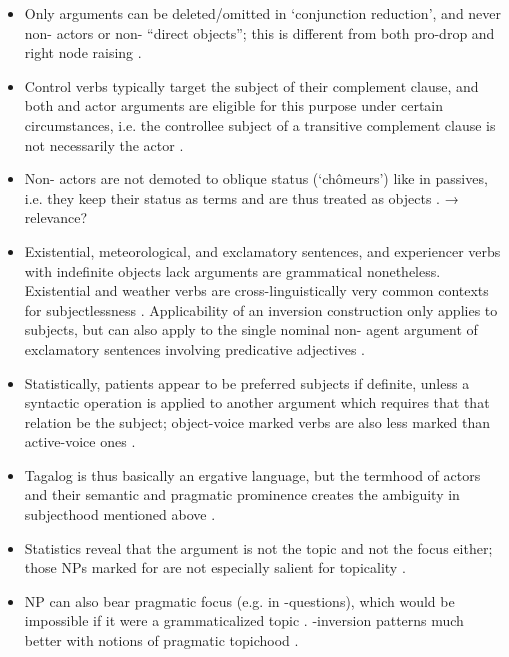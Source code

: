 \begin{itemize}
\begin{itemize}
		\item Only \Nom{} arguments can be deleted/omitted in `conjunction
		reduction', and never non-\Nom{} actors or non-\Nom{} ``direct
		objects''; this is different from both pro-drop and right node raising
		\citep[32-34]{kroeger1991}.
		\item Control verbs typically target the subject of their complement
		clause, and both \Nom{} and actor arguments are eligible for this
		purpose under certain circumstances, i.e. the controllee subject of a
		transitive complement clause is not necessarily the actor
		\citep[36--38]{kroeger1991}.
		\item Non-\Nom{} actors are not demoted to oblique status (`chômeurs')
		like in passives, i.e. they keep their status as terms and are thus
		treated as objects \citep[38\psqq]{kroeger1991}. → relevance?
		\item Existential, meteorological, and exclamatory sentences, and
		experiencer verbs with indefinite objects lack \Nom{} arguments are
		grammatical nonetheless. Existential and weather verbs are
		cross-linguistically very common contexts for subjectlessness
		\citep[46--49]{kroeger1991}. Applicability of an inversion construction
		only applies to subjects, but can also apply to the single nominal
		non-\Nom{} agent argument of exclamatory sentences involving
		predicative adjectives \cite[50]{kroeger1991}.
		\item Statistically, patients appear to be preferred subjects if
		definite, unless a syntactic operation is applied to another argument
		which requires that that relation be the subject; object-voice marked
		verbs are also less marked than active-voice ones
		\citep[53]{kroeger1991}.
		\item Tagalog is thus basically an ergative language, but the termhood
		of actors and their semantic and pragmatic prominence creates the
		ambiguity in subjecthood mentioned above \citep[54]{kroeger1991}.
		\item Statistics reveal that the \Nom{} argument is not the topic and
		not the focus either; those NPs marked for \Nom{} are not especially
		salient for topicality \citep[56\psqq]{kroeger1991}.
		\item \Nom{} NP can also bear pragmatic focus (e.g. in
		-questions), which would be impossible if it were a
		grammaticalized topic \citep[60\psqq]{kroeger1991}. -inversion
		patterns much better with notions of pragmatic topichood \citep[63]
		{kroeger1991}.
	\end{itemize}

\end{itemize}

